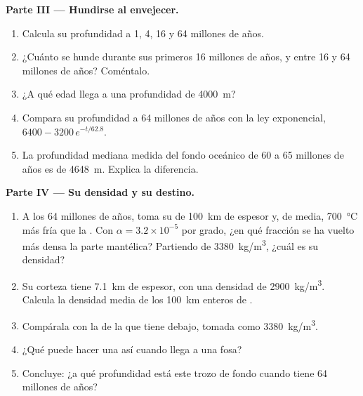 \begin{problem}
\medskip
\noindent\textbf{Parte III --- Hundirse al envejecer.}
\begin{enumerate}[resume]
  \item Calcula su profundidad a 1, 4, 16 y 64 millones de años.
  \item ¿Cuánto se hunde durante sus primeros 16 millones de años, y entre 16
        y 64 millones de años? Coméntalo.
  \item ¿A qué edad llega a una profundidad de \qty{4000}{m}?
  \item Compara su profundidad a 64 millones de años con la ley exponencial,
        $6400 - 3200\,e^{-t/62.8}$.
  \item La profundidad mediana medida del fondo oceánico de 60 a 65 millones
        de años es de \qty{4648}{m}. Explica la diferencia.
\end{enumerate}

\medskip
\noindent\textbf{Parte IV --- Su densidad y su destino.}
\begin{enumerate}[resume]
  \item A los 64 millones de años, toma su  de \qty{100}{km} de
        espesor y, de media, \qty{700}{\celsius} más fría que la .
        Con $\alpha = 3.2 \times 10^{-5}$ por grado, ¿en qué fracción se ha
        vuelto más densa la parte mantélica? Partiendo de \qty{3380}{kg/m^3},
        ¿cuál es su densidad?
  \item Su corteza tiene \qty{7.1}{km} de espesor, con una densidad de
        \qty{2900}{kg/m^3}. Calcula la densidad media de los
        \qty{100}{km} enteros de .
  \item Compárala con la de la  que tiene debajo, tomada como
        \qty{3380}{kg/m^3}.
  \item ¿Qué puede hacer una  así cuando llega a una fosa?
  \item Concluye: ¿a qué profundidad está este trozo de fondo cuando tiene 64
        millones de años?
\end{enumerate}
\end{problem}
